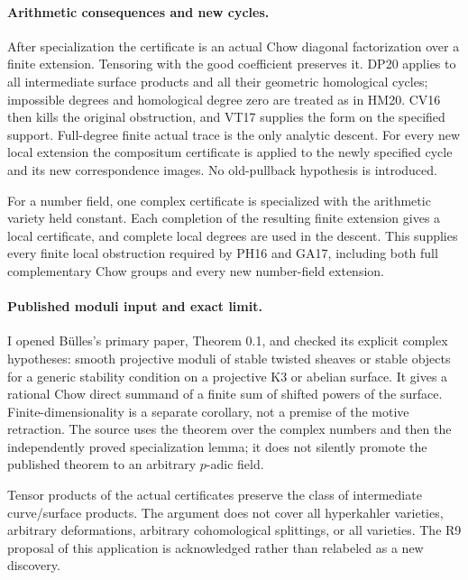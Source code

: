 \paragraph{Arithmetic consequences and new cycles.}
After specialization the certificate is an actual Chow diagonal
factorization over a finite extension. Tensoring with the good
coefficient preserves it. DP20 applies to all intermediate surface
products and all their geometric homological cycles; impossible
degrees and homological degree zero are treated as in HM20.
CV16 then kills the original obstruction, and VT17 supplies the form
on the specified support. Full-degree finite actual trace is the only
analytic descent. For every new local extension the compositum
certificate is applied to the newly specified cycle and its new
correspondence images. No old-pullback hypothesis is introduced.

For a number field, one complex certificate is specialized with the
arithmetic variety held constant. Each completion of the resulting
finite extension gives a local certificate, and complete local
degrees are used in the descent. This supplies every finite local
obstruction required by PH16 and GA17, including both full
complementary Chow groups and every new number-field extension.

\paragraph{Published moduli input and exact limit.}
I opened B\"ulles's primary paper, Theorem 0.1, and checked its
explicit complex hypotheses: smooth projective moduli of stable
twisted sheaves or stable objects for a generic stability condition
on a projective K3 or abelian surface. It gives a rational Chow
direct summand of a finite sum of shifted powers of the surface.
Finite-dimensionality is a separate corollary, not a premise of
the motive retraction. The source uses the theorem over the complex
numbers and then the independently proved specialization lemma;
it does not silently promote the published theorem to an arbitrary
$p$-adic field.

Tensor products of the actual certificates preserve the class of
intermediate curve/surface products. The argument does not cover
all hyperkahler varieties, arbitrary deformations, arbitrary
cohomological splittings, or all varieties. The R9 proposal of this
application is acknowledged rather than relabeled as a new discovery.

